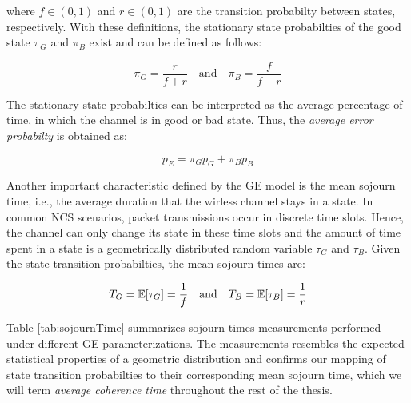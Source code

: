 where $f\in(0,1)$ and $r\in(0,1)$ are the transition probabilty between states,
respectively. With these definitions, the stationary state probabilties of the
good state $\pi_G$ and $\pi_B$ exist and can be defined as follows:

\begin{equation}
  \pi_G = \frac{r}{f+r} \quad \textrm{and} \quad \pi_B = \frac{f}{f+r}
\end{equation}

The stationary state probabilties can be interpreted as the average percentage
of time, in which the channel is in good or bad state. Thus, the \textit{average
error probabilty} is obtained as:

\begin{equation}
  p_E = \pi_G p_G + \pi_B p_B
  \label{eq:avgLoss}
\end{equation}

Another important characteristic defined by the GE model is the mean sojourn
time, i.e., the average duration that the wirless channel stays in a state. In
common NCS scenarios, packet transmissions occur in discrete time slots. Hence,
the channel can only change its state in these time slots and the amount of time
spent in a state is a geometrically distributed random variable $\tau_G$ and
$\tau_B$. Given the state transition probabilties, the mean sojourn times are:

\begin{equation}
  T_G = \mathbb{E}[\tau_G] = \frac{1}{f} \quad \textrm{and} \quad T_B = \mathbb{E}[\tau_B] = \frac{1}{r}
\end{equation}

Table \ref{tab:sojournTime} summarizes sojourn times measurements performed
under different GE parameterizations. The measurements resembles the expected
statistical properties of a geometric distribution and confirms our mapping of
state transition probabilties to their corresponding mean sojourn time, which we
will term \textit{average coherence time} throughout the rest of the thesis.

